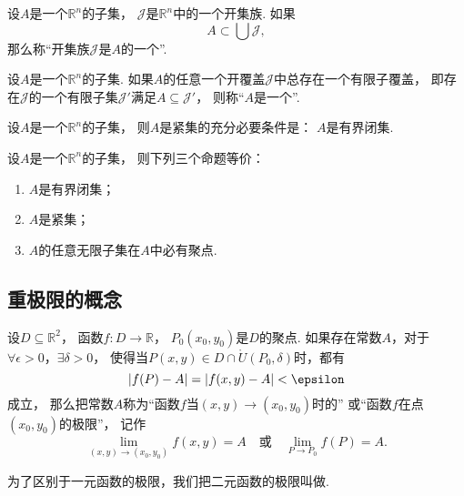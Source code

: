 \begin{definition}
设\(A\)是一个\(\mathbb{R}^n\)的子集，
\(\mathscr{J}\)是\(\mathbb{R}^n\)中的一个开集族.
如果\[
	A \subset \bigcup\mathscr{J},
\]
那么称“开集族\(\mathscr{J}\)是\(A\)的一个”.
\end{definition}
\begin{definition}
设\(A\)是一个\(\mathbb{R}^n\)的子集.
如果\(A\)的任意一个开覆盖\(\mathscr{J}\)中总存在一个有限子覆盖，
即存在\(\mathscr{J}\)的一个有限子集\(\mathscr{J}'\)满足\(A \subseteq \mathscr{J}'\)，
则称“\(A\)是一个”.
\end{definition}
\begin{theorem}
设\(A\)是一个\(\mathbb{R}^n\)的子集，
则\(A\)是紧集的充分必要条件是：
\(A\)是有界闭集.
\end{theorem}
\begin{theorem}
设\(A\)是一个\(\mathbb{R}^n\)的子集，
则下列三个命题等价：\begin{enumerate}
	\item \(A\)是有界闭集；
	\item \(A\)是紧集；
	\item \(A\)的任意无限子集在\(A\)中必有聚点.
\end{enumerate}
\end{theorem}

\subsection{重极限的概念}
\begin{definition}
设\(D\subseteq\mathbb{R}^2\)，
函数\(f\colon D\to\mathbb{R}\)，
\(P_0(x_0,y_0)\)是\(D\)的聚点.
如果存在常数\(A\)，对于\(\forall \epsilon > 0\)，\(\exists \delta > 0\)，
使得当\(P(x,y) \in D \cap \mathring{U}(P_0,\delta)\)时，都有\[
	\abs{f(P)-A} = \abs{f(x,y)-A} < \epsilon
\]成立，
那么把常数\(A\)称为“函数\(f\)当\((x,y)\to(x_0,y_0)\)时的”
或“函数\(f\)在点\((x_0,y_0)\)的极限”，
记作\[
	\lim_{(x,y)\to(x_0,y_0)} f(x,y) = A
	\quad\text{或}\quad
	\lim_{P \to P_0} f(P) = A.
\]

为了区别于一元函数的极限，我们把二元函数的极限叫做.
\end{definition}

